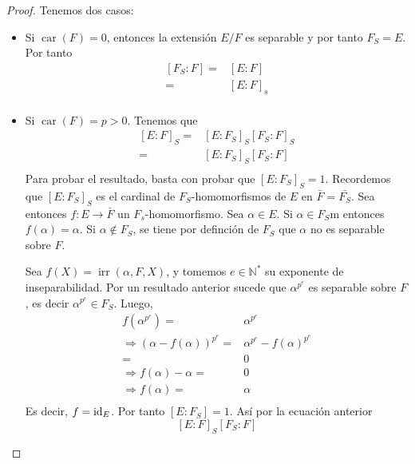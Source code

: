 \documentclass[12pt]{report}
\theoremstyle{largebreak}
\DeclareMathOperator{\car}{car}
\DeclareMathOperator{\irr}{irr}
\begin{document}
    \begin{proof}
        Tenemos dos casos:
        \begin{itemize}
            \item Si $\car(F)=0$, entonces la extensión $E/F$ es separable y por tanto $F_S=E$. Por tanto
            \begin{equation*}
                \begin{split}
                    \left[F_S:F\right]=&\left[E:F\right]\\
                    =&\left[E:F\right]_s\\
                \end{split}
            \end{equation*}
            \item Si $\car(F)=p>0$. Tenemos que
            \begin{equation*}
                \begin{split}
                    \left[E:F\right]_S=&\left[E:F_S\right]_S\left[F_S:F\right]_S\\
                    =&\left[E:F_S\right]_S\left[F_S:F\right]\\
                \end{split}
            \end{equation*}
            Para probar el resultado, basta con probar que $\left[E:F_S\right]_S=1$. Recordemos que $\left[E:F_S\right]_S$ es el cardinal de $F_S$-homomorfismos de $E$ en $\bar{F}=\bar{F_S}$. Sea entonces $f:E\rightarrow \bar{F}$ un $F_s$-homomorfismo.
            Sea $\alpha\in E$. Si $\alpha\in F_S$m entonces $f(\alpha)=\alpha$. Si $\alpha\notin F_S$, se tiene por definción de $F_S$ que $\alpha$ no es separable sobre $F$. 
            
            Sea $f(X)=\irr(\alpha, F, X)$, y tomemos $e\in\mathbb{N}^{*}$ su exponente de inseparabilidad. 
            Por un resultado anterior sucede que $\alpha^{p^e}$ es separable sobre $F$, es decir $\alpha^{p^e}\in F_S$. Luego,
            \begin{equation*}
                \begin{split}
                    f(\alpha^{p^e})=&\alpha^{p^e}\\
                    \Rightarrow \left(\alpha-f(\alpha)\right)^{p^e}=&\alpha^{p^e}-f(\alpha)^{p^e}\\
                    =&0\\
                    \Rightarrow f(\alpha)-\alpha=&0\\
                    \Rightarrow f(\alpha)=&\alpha\\
                \end{split}
            \end{equation*}
            Es decir, $f=\textup{id}_E$. Por tanto $\left[E:F_S\right]=1$. Así por la ecuación anterior
            \begin{equation*}
                \left[E:F\right]_S\left[F_S:F\right]
            \end{equation*}
        \end{itemize}
    \end{proof}
\end{document}
